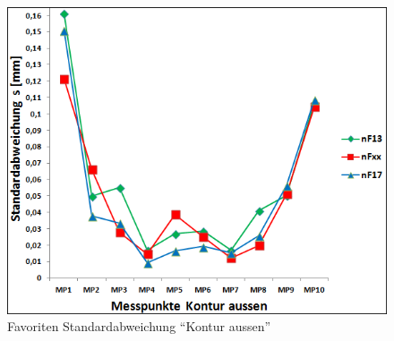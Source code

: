 \documentclass[12pt,a4paper,parskip]{scrartcl}
\begin{document}
\begin{figure}[hbtp]
\centering
\includegraphics[width=.8\textwidth]{standardnF13nFxxnF17.png}
\caption{Favoriten Standardabweichung "`Kontur aussen"' }
\label{fig:favstrb}
\end{figure}








\newpage
\end{document}
